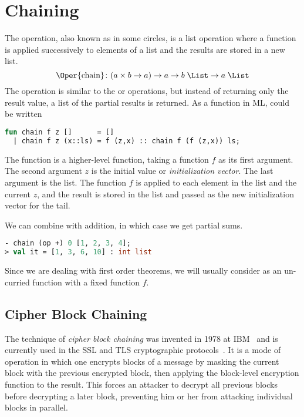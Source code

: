 \chapter{Chaining}\label{chap:chaining}

The  operation, also known as  in some circles, is a
list operation where a function is applied successively to elements of a list
and the results are stored in a new list.
\[ \text{\Oper{chain}} \colon (a \times b \to a) \to a \to b \; \List \to a \; \List \]
The operation is similar to the
 or  operations, but instead of returning
only the result value, a list of the partial results is returned. As a function
in ML,  could be written
\begin{lstlisting}[language=ML, style=Inline]
fun chain f z []      = []
  | chain f z (x::ls) = f (z,x) :: chain f (f (z,x)) ls;
\end{lstlisting}
The  function is a higher-level function, taking a function
$f$ as its first argument. The second argument $z$ is the initial value or
\emph{initialization vector}. The last argument is the list. The function
$f$ is applied to each element in the list and the current $z$, and the
result is stored in the list and passed as the new initialization vector
for the tail.

\begin{Example}
We can combine  with addition, in
    which case we get partial sums.
    \begin{lstlisting}[language=ML, style=Inline]
- chain (op +) 0 [1, 2, 3, 4];
> val it = [1, 3, 6, 10] : int list
    \end{lstlisting}
\end{Example}

Since we are dealing with first order theorems, we will usually consider
 as an un-curried function with a fixed function $f$.

\section{Cipher Block Chaining}\label{sec:cbc}

The technique of \emph{cipher block chaining} was invented in 1978 at
IBM~\cite{ehrsam1978message} and is currently used in the SSL and TLS
cryptographic protocols~\cite{rfc5246}. It is a mode of operation in which one
encrypts blocks of a message by masking the current block with the previous
encrypted block, then applying the block-level encryption function to the
result. This forces an attacker to decrypt all previous blocks before
decrypting a later block, preventing him or her from attacking individual
blocks in parallel.

